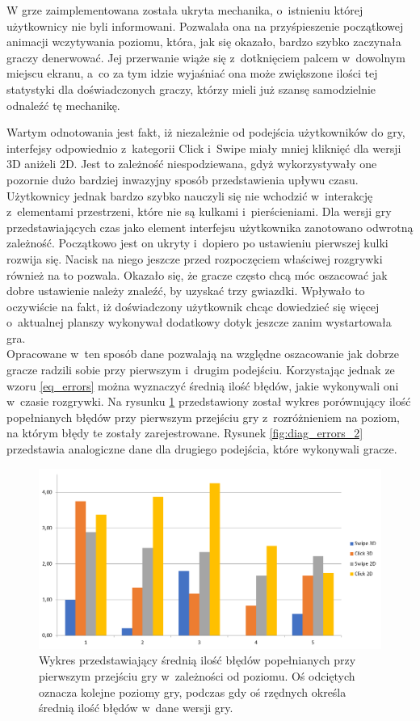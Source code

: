 \documentclass[a4paper,12pt,numbers=noenddot]{report}
\begin{document}
W grze zaimplementowana została ukryta mechanika, o~istnieniu której użytkownicy nie byli informowani. Pozwalała ona na przyśpieszenie początkowej animacji wczytywania poziomu, która, jak się okazało, bardzo szybko zaczynała graczy denerwować. Jej przerwanie wiąże się z~dotknięciem palcem w~dowolnym miejscu ekranu, a~co za tym idzie wyjaśniać ona może zwiększone ilości tej statystyki dla doświadczonych graczy, którzy mieli już szansę samodzielnie odnaleźć tę mechanikę.

Wartym odnotowania jest fakt, iż niezależnie od podejścia użytkowników do gry, interfejsy odpowiednio z~kategorii Click i~Swipe miały mniej kliknięć dla wersji 3D aniżeli 2D. Jest to zależność niespodziewana, gdyż wykorzystywały one pozornie dużo bardziej inwazyjny sposób przedstawienia upływu czasu. Użytkownicy jednak bardzo szybko nauczyli się nie wchodzić w~interakcję z~elementami przestrzeni, które nie są kulkami i~pierścieniami. Dla wersji gry przedstawiających czas jako element interfejsu użytkownika zanotowano odwrotną zależność. Początkowo jest on ukryty i~dopiero po ustawieniu pierwszej kulki rozwija się. Nacisk na niego jeszcze przed rozpoczęciem właściwej rozgrywki również na to pozwala. Okazało się, że gracze często chcą móc oszacować jak dobre ustawienie należy znaleźć, by uzyskać trzy gwiazdki. Wpływało to oczywiście na fakt, iż doświadczony użytkownik chcąc dowiedzieć się więcej o~aktualnej planszy wykonywał dodatkowy dotyk jeszcze zanim wystartowała gra.\\

Opracowane w~ten sposób dane pozwalają na względne oszacowanie jak dobrze gracze radzili sobie przy pierwszym i~drugim podejściu. Korzystając jednak ze wzoru \ref{eq_errors} można wyznaczyć średnią ilość błędów, jakie wykonywali oni w~czasie rozgrywki. 
Na rysunku \ref{fig:diag_errors_1} przedstawiony został wykres porównujący ilość popełnianych błędów przy pierwszym przejściu gry z~rozróżnieniem na poziom, na którym błędy te zostały zarejestrowane. Rysunek \ref{fig:diag_errors_2} przedstawia analogiczne dane dla drugiego podejścia, które wykonywali gracze.

\begin{figure}[h!]
	\centering
  	\includegraphics[width=\linewidth]{diag/errors_1.png}
	\caption{Wykres przedstawiający średnią ilość błędów popełnianych przy pierwszym przejściu gry w~zależności od poziomu. Oś odciętych oznacza kolejne poziomy gry, podczas gdy oś rzędnych określa średnią ilość błędów w~dane wersji gry.}
	\label{fig:diag_errors_1}
\end{figure}
\end{document}
